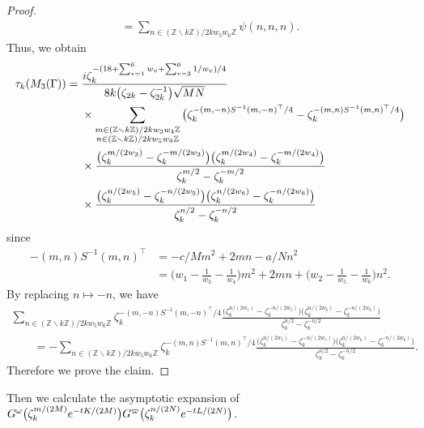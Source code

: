 \documentclass[11pt]{article}
\numberwithin{equation}{section}
\newcommand{\Z}{\mathbb{Z}}
\numberwithin{equation}{section}
\newcommand{\trans}[1]{#1^\top}
\begin{document}
\begin{proof}
\begin{align*}
		= 	\sum_{n \in (\Z \smallsetminus k\Z) / 2k w_5 w_6\Z} \psi (n, n, n).
	\end{align*}
	Thus, we obtain
	\begin{align*}
		\tau_k(M_3(\Gamma))		= {}&\frac{{\rm i} \zeta_{k}^{-(18 + \sum_{v=1}^{6}w_{v} + \sum_{v=3}^{6} 1/w_{v})/4}}{8k \big(\zeta_{2k}-\zeta_{2k}^{-1}\big) \sqrt{MN}}
\\
&\times\sum_{\substack{m \in (\Z \smallsetminus k\Z) / 2kw_3w_4\Z \\ n \in (\Z \smallsetminus k\Z) / 2kw_5w_6\Z}}
\big( \zeta_k^{-(m, -n) S^{-1} \trans{(m, -n)}/4} - \zeta_k^{-(m, n) S^{-1} \trans{(m, n)}/4} \big)
\\
&\times\frac{\big( \zeta_k^{m/(2w_3)} - \zeta_k^{-m/(2w_3)} \big)\big( \zeta_k^{m/(2w_4)} - \zeta_k^{-m/(2w_4)} \big)}{ \zeta_k^{m/2} - \zeta_k^{-m/2}}
\\
&\times\frac{\big( \zeta_k^{n/(2w_5)} - \zeta_k^{-n/(2w_5)} \big)\big( \zeta_k^{n/(2w_6)} - \zeta_k^{-n/(2w_6)} \big)}{\zeta_k^{n/2} - \zeta_k^{-n/2}}
	\end{align*}
	since
	\begin{align*}
		-(m, n) S^{-1} \trans{(m, n)}
		&= -c/M m^{2} + 2mn - a/Nn^{2}
\\
		&= \bigg( w_1 - \frac{1}{w_3} - \frac{1}{w_4} \bigg) m^2 + 2mn + \bigg( w_2 - \frac{1}{w_5} - \frac{1}{w_6} \bigg) n^2.
	\end{align*}
	By replacing $ n \mapsto -n $, we have
	\begin{gather*}
		\sum_{ n \in (\Z \smallsetminus k\Z) / 2kw_5w_6\Z }
		\zeta_k^{-(m, -n) S^{-1} \trans{(m, -n)}/4}
		\frac{\big( \zeta_k^{n/(2w_5)} - \zeta_k^{-n/(2w_5)} \big)\big( \zeta_k^{n/(2w_6)} - \zeta_k^{-n/(2w_6)} \big)}
		{\zeta_k^{n/2} - \zeta_k^{-n/2}}
\\ \qquad
		{}= -\sum_{ n \in (\Z \smallsetminus k\Z) / 2kw_5w_6\Z }
		\zeta_k^{-(m, n) S^{-1} \trans{(m, n)}/4}
		\frac{\big( \zeta_k^{n/(2w_5)} - \zeta_k^{-n/(2w_5)} \big)\big( \zeta_k^{n/(2w_6)} - \zeta_k^{-n/(2w_6)} \big)}
		{\zeta_k^{n/2} - \zeta_k^{-n/2}}.
	\end{gather*}
	Therefore we prove the claim.
\end{proof}

Then we calculate the asymptotic expansion of $G^\omega\big(\zeta_k^{m/(2M)} {\rm e}^{-tK/(2M)}\big) G^\varpi\big(\zeta_k^{n/(2N)} {\rm e}^{-tL/(2N)}\big)$.
\end{document}
